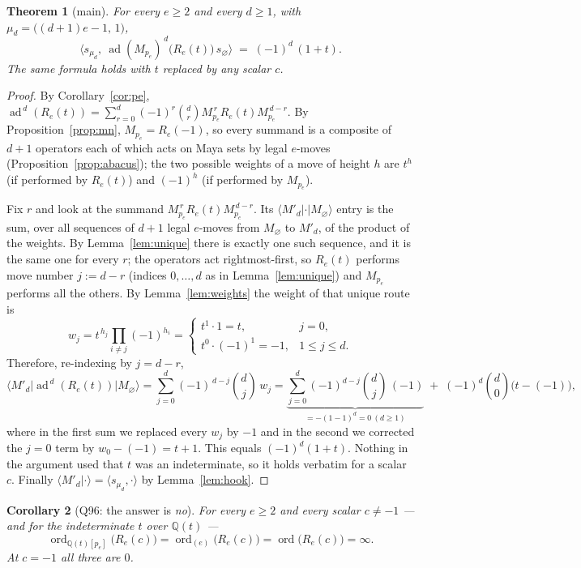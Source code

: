 \documentclass[11pt]{article}
\newtheorem{theorem}{Theorem}
\newtheorem{corollary}[theorem]{Corollary}
\theoremstyle{definition}
\DeclareMathOperator{\ord}{ord}
\DeclareMathOperator{\ad}{ad}
\newcommand{\Q}{\mathbb{Q}}
\begin{document}
\begin{theorem}[main]\label{thm:main}
For every $e\ge2$ and every $d\ge1$, with $\mu_d=\bigl((d+1)e-1,\,1\bigr)$,
\[
  \boxed{\ \bigl\langle s_{\mu_d},\ \ad(M_{p_e})^{\,d}\bigl(R_e(t)\bigr)\,s_\varnothing\bigr\rangle
  \;=\;(-1)^{d}\,(1+t).\ }
\]
The same formula holds with $t$ replaced by any scalar $c$.
\end{theorem}

\begin{proof}
By Corollary~\ref{cor:pe},
$\ad^{\,d}(R_e(t))=\sum_{r=0}^d(-1)^r\binom dr M_{p_e}^{\,r}R_e(t)M_{p_e}^{\,d-r}$.  By
Proposition~\ref{prop:mn}, $M_{p_e}=R_e(-1)$, so every summand is a composite of $d+1$
operators each of which acts on Maya sets by legal $e$-moves
(Proposition~\ref{prop:abacus}); the two possible weights of a move of height $h$ are
$t^{h}$ (if performed by $R_e(t)$) and $(-1)^{h}$ (if performed by $M_{p_e}$).

Fix $r$ and look at the summand $M_{p_e}^{\,r}R_e(t)M_{p_e}^{\,d-r}$.  Its
$\langle M'_d|\cdot|M_\varnothing\rangle$ entry is the sum, over all sequences of $d+1$
legal $e$-moves from $M_\varnothing$ to $M'_d$, of the product of the weights.  By
Lemma~\ref{lem:unique} there is exactly one such sequence, and it is the same one for
every $r$; the operators act rightmost-first, so $R_e(t)$ performs move number
$j:=d-r$ (indices $0,\dots,d$ as in Lemma~\ref{lem:unique}) and $M_{p_e}$ performs all the
others.  By Lemma~\ref{lem:weights} the weight of that unique route is
\[
  w_j=t^{\,h_j}\prod_{i\neq j}(-1)^{h_i}
    =\begin{cases}t^{1}\cdot 1=t, & j=0,\\[2pt] t^{0}\cdot(-1)^{1}=-1, & 1\le j\le d.\end{cases}
\]
Therefore, re-indexing by $j=d-r$,
\[
  \bigl\langle M'_d\bigl|\ad^{\,d}(R_e(t))\bigr|M_\varnothing\bigr\rangle
  =\sum_{j=0}^{d}(-1)^{\,d-j}\binom{d}{j}\,w_j
  =\underbrace{\sum_{j=0}^{d}(-1)^{d-j}\binom dj\,(-1)}_{=-(1-1)^d=0\ (d\ge1)}
   \;+\;(-1)^{d}\binom d0\bigl(t-(-1)\bigr),
\]
where in the first sum we replaced every $w_j$ by $-1$ and in the second we corrected the
$j=0$ term by $w_0-(-1)=t+1$.  This equals $(-1)^d(1+t)$.  Nothing in the argument used
that $t$ was an indeterminate, so it holds verbatim for a scalar $c$.  Finally
$\langle M'_d|\cdot\rangle=\langle s_{\mu_d},\cdot\rangle$ by Lemma~\ref{lem:hook}.
\end{proof}

\begin{corollary}[Q96: the answer is \emph{no}]\label{cor:q96}
For every $e\ge2$ and every scalar $c\neq-1$ --- and for the indeterminate $t$ over $\Q(t)$ ---
\[
  \ord_{\Q(t)[p_e]}\bigl(R_e(c)\bigr)
  =\ord_{(e)}\bigl(R_e(c)\bigr)
  =\ord\bigl(R_e(c)\bigr)=\infty .
\]
At $c=-1$ all three are $0$.
\end{corollary}
\end{document}
